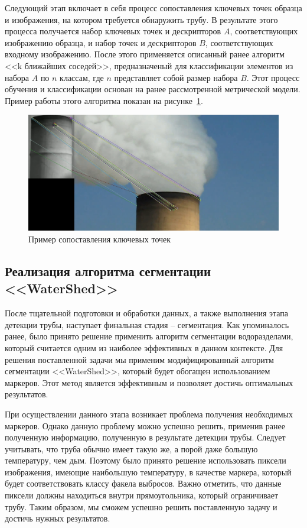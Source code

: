 \documentclass[14pt, a4paper]{extreport}
\begin{document}
	Следующий этап включает в себя процесс сопоставления ключевых точек образца и изображения, на котором требуется обнаружить трубу. В результате этого процесса получается набор ключевых точек и дескрипторов $A$, соответствующих изображению образца, и набор точек и дескрипторов $B$, соответствующих входному изображению. После этого применяется описанный ранее алгоритм <<k ближайших соседей>>, предназначеный для классификации элементов из набора $A$ по $n$ классам, где $n$ представляет собой размер набора $B$. Этот процесс обучения и классификации основан на ранее рассмотренной метрической модели. Пример работы этого алгоритма показан на рисунке~\ref{fig:match1}.
	\begin{figure}[h!]
		\centering
		\includegraphics[width = \textwidth]{image/chapter_2/match1}	
		\caption{Пример сопоставления ключевых точек}
		\label{fig:match1}
	\end{figure}
	
	\subsection[Реализация алгоритма сегментации <<WaterShed>>]{Реализация алгоритма сегментации <<WaterShed>>}
	После тщательной подготовки и обработки данных, а также выполнения этапа детекции трубы, наступает финальная стадия -- сегментация. Как упоминалось ранее, было принято решение применить алгоритм сегментации водоразделами, который считается одним из наиболее эффективных в данном контексте. Для решения поставленной задачи мы применим модифицированный алгоритм сегментации <<WaterShed>>, который будет обогащен использованием маркеров. Этот метод является эффективным и позволяет достичь оптимальных результатов.
	
	При осуществлении данного этапа возникает проблема получения необходимых маркеров. Однако данную проблему можно успешно решить, применив ранее полученную информацию, полученную в результате детекции трубы. Следует учитывать, что труба обычно имеет такую же, а порой даже большую температуру, чем дым. Поэтому было принято решение использовать пиксели изображения, имеющие наибольшую температуру, в качестве маркера, который будет соответствовать классу факела выбросов. Важно отметить, что данные пиксели должны находиться внутри прямоугольника, который ограничивает трубу. Таким образом, мы сможем успешно решить поставленную задачу и достичь нужных результатов.
	
\end{document}
